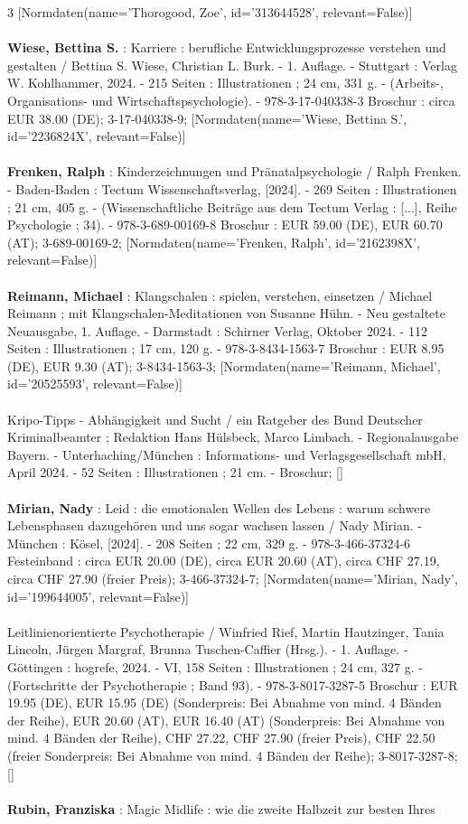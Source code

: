 \documentclass{article}
\begin{document}
\begin{multicols}{3}
[Normdaten(name='Thorogood, Zoe', id='313644528', relevant=False)]\\\\\textbf{Wiese, Bettina S.} : Karriere : berufliche Entwicklungsprozesse verstehen und gestalten / Bettina S. Wiese, Christian L. Burk. - 1. Auflage. - Stuttgart : Verlag W. Kohlhammer, 2024. - 215 Seiten : Illustrationen ; 24 cm, 331 g. - (Arbeits-, Organisations- und Wirtschaftspsychologie). - 978-3-17-040338-3 Broschur : circa EUR 38.00 (DE); 3-17-040338-9; [Normdaten(name='Wiese, Bettina S.', id='2236824X', relevant=False)]\\\\\textbf{Frenken, Ralph} : Kinderzeichnungen und Pränatalpsychologie / Ralph Frenken. - Baden-Baden : Tectum Wissenschaftsverlag, [2024]. - 269 Seiten : Illustrationen ; 21 cm, 405 g. - (Wissenschaftliche Beiträge aus dem Tectum Verlag : [...], Reihe Psychologie ; 34). - 978-3-689-00169-8 Broschur : EUR 59.00 (DE), EUR 60.70 (AT); 3-689-00169-2; [Normdaten(name='Frenken, Ralph', id='2162398X', relevant=False)]\\\\\textbf{Reimann, Michael} : Klangschalen : spielen, verstehen, einsetzen / Michael Reimann ; mit Klangschalen-Meditationen von Susanne Hühn. - Neu gestaltete Neuausgabe, 1. Auflage. - Darmstadt : Schirner Verlag, Oktober 2024. - 112 Seiten : Illustrationen ; 17 cm, 120 g. - 978-3-8434-1563-7 Broschur : EUR 8.95 (DE), EUR 9.30 (AT); 3-8434-1563-3; [Normdaten(name='Reimann, Michael', id='20525593', relevant=False)]\\\\Kripo-Tipps - Abhängigkeit und Sucht / ein Ratgeber des Bund Deutscher Kriminalbeamter ; Redaktion Hans Hülsbeck, Marco Limbach. - Regionalausgabe Bayern. - Unterhaching/München : Informations- und Verlagsgesellschaft mbH, April 2024. - 52 Seiten : Illustrationen ; 21 cm. - Broschur; []\\\\\textbf{Mirian, Nady} : Leid : die emotionalen Wellen des Lebens : warum schwere Lebensphasen dazugehören und uns sogar wachsen lassen / Nady Mirian. - München : Kösel, [2024]. - 208 Seiten ; 22 cm, 329 g. - 978-3-466-37324-6 Festeinband : circa EUR 20.00 (DE), circa EUR 20.60 (AT), circa CHF 27.19, circa CHF 27.90 (freier Preis); 3-466-37324-7; [Normdaten(name='Mirian, Nady', id='199644005', relevant=False)]\\\\Leitlinienorientierte Psychotherapie / Winfried Rief, Martin Hautzinger, Tania Lincoln, Jürgen Margraf, Brunna Tuschen-Caffier (Hrsg.). - 1. Auflage. - Göttingen : hogrefe, 2024. - VI, 158 Seiten : Illustrationen ; 24 cm, 327 g. - (Fortschritte der Psychotherapie ; Band 93). - 978-3-8017-3287-5 Broschur : EUR 19.95 (DE), EUR 15.95 (DE) (Sonderpreis: Bei Abnahme von mind. 4 Bänden der Reihe), EUR 20.60 (AT), EUR 16.40 (AT) (Sonderpreis: Bei Abnahme von mind. 4 Bänden der Reihe), CHF 27.22, CHF 27.90 (freier Preis), CHF 22.50 (freier Sonderpreis: Bei Abnahme von mind. 4 Bänden der Reihe); 3-8017-3287-8; []\\\\\textbf{Rubin, Franziska} : Magic Midlife : wie die zweite Halbzeit zur besten Ihres 
\end{multicols}
\end{document}
